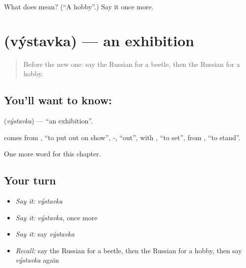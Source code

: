 \begin{tcolorbox}[breakable,colback=teal!4,colframe=teal!35!black,title={Before you move on}]
What does  mean? (\textquotedblleft{}A hobby\textquotedblright{}.) Say it once more.
\end{tcolorbox}
\section[\texorpdfstring{\ru{выставка} (výstavka)}{выставка (výstavka)}]{ (výstavka) — an exhibition}

\label{lesson:RU-C197-vystavka}



\begin{quote}
Before the new one: say the Russian for a beetle, then the Russian for a hobby.
\end{quote}

\subsection*{You'll want to know: }
\textbf{} (\emph{výstavka}) — \textquotedblleft{}an exhibition\textquotedblright{}.

\begin{cousinweb}
\textbf{} comes from \emph{}, \textquotedblleft{}to put out on show\textquotedblright{}, \emph{-}, \textquotedblleft{}out\textquotedblright{}, with \emph{}, \textquotedblleft{}to set\textquotedblright{}, from \emph{}, \textquotedblleft{}to stand\textquotedblright{}.
\end{cousinweb}

\begin{grammarlens}[title={What you've built}]
One more word for this chapter.
\end{grammarlens}

\subsection*{Your turn}
\begin{itemize}
\raggedright
  \item \emph{Say it:} \emph{výstavka}
  \item \emph{Say it:} \emph{výstavka}, once more
  \item \emph{Say it:} say \emph{výstavka}
  \item \emph{Recall:} say the Russian for a beetle, then the Russian for a hobby, then say \emph{výstavka} again
\end{itemize}

